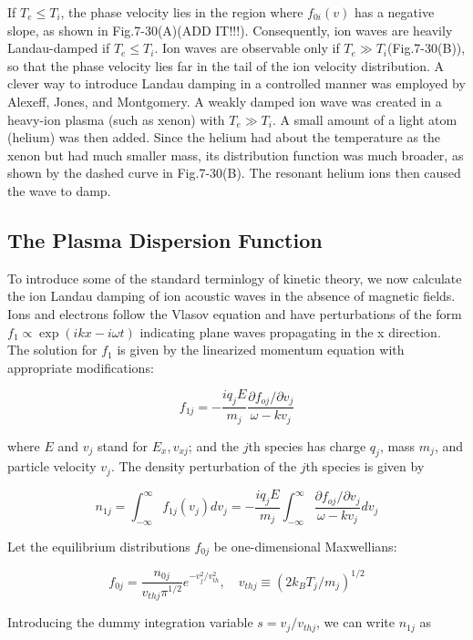 \documentclass[
  notoc %
]{tufte-book}
\begin{document}
If \(T_e \le T_i\), the phase velocity lies in the region where
\(f_{0i}(v)\) has a negative slope, as shown in Fig.7-30(A)(ADD IT!!!).
Consequently, ion waves are heavily Landau-damped if \(T_e \le T_i\).
Ion waves are observable only if \(T_e \gg T_i\)(Fig.7-30(B)), so that
the phase velocity lies far in the tail of the ion velocity
distribution. A clever way to introduce Landau damping in a controlled
manner was employed by Alexeff, Jones, and Montgomery. A weakly damped
ion wave was created in a heavy-ion plasma (such as xenon) with
\(T_e \gg T_i\). A small amount of a light atom (helium) was then added.
Since the helium had about the temperature as the xenon but had much
smaller mass, its distribution function was much broader, as shown by
the dashed curve in Fig.7-30(B). The resonant helium ions then caused
the wave to damp.

\hypertarget{the-plasma-dispersion-function}{%
\subsection{The Plasma Dispersion
Function}\label{the-plasma-dispersion-function}}

To introduce some of the standard terminlogy of kinetic theory, we now
calculate the ion Landau damping of ion acoustic waves in the absence of
magnetic fields. Ions and electrons follow the Vlasov equation and have
perturbations of the form \(f_1\propto\exp(ikx-i\omega t)\) indicating
plane waves propagating in the x direction. The solution for \(f_1\) is
given by the linearized momentum equation with appropriate
modifications:

\[
f_{1j} = -\frac{iq_jE}{m_j}\frac{\partial f_{oj}/\partial v_j}{\omega-kv_j}
\]

where \(E\) and \(v_j\) stand for \(E_x, v_{xj}\); and the \(j\)th
species has charge \(q_j\), mass \(m_j\), and particle velocity \(v_j\).
The density perturbation of the \(j\)th species is given by

\[
n_{1j} = \int_{-\infty}^{\infty}f_{1j}(v_j)dv_j = -\frac{iq_jE}{m_j}\int_{-\infty}^{\infty}\frac{\partial f_{oj}/\partial v_j}{\omega-kv_j}dv_j
\]

Let the equilibrium distributions \(f_{0j}\) be one-dimensional
Maxwellians:

\[
f_{0j} = \frac{n_{0j}}{v_{thj}\pi^{1/2}}e^{-v_j^2/v_{th}^2},\quad v_{thj}\equiv (2k_B T_j/m_j)^{1/2}
\]

Introducing the dummy integration variable \(s = v_j/v_{thj}\), we can
write \(n_{1j}\) as
\end{document}
